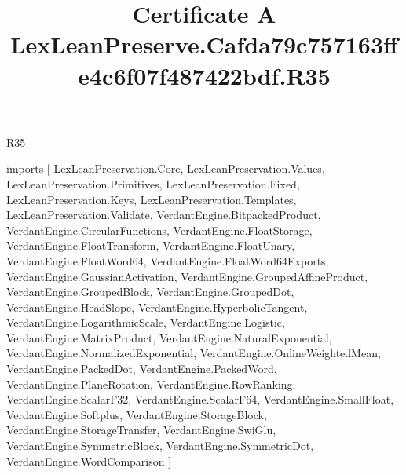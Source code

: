 \begin{lexlean}{R35}
\title{Certificate A LexLeanPreserve.Cafda79c757163ffe4c6f07f487422bdf.R35}
\begin{coremodule}
imports [
  LexLeanPreservation.Core,
  LexLeanPreservation.Values,
  LexLeanPreservation.Primitives,
  LexLeanPreservation.Fixed,
  LexLeanPreservation.Keys,
  LexLeanPreservation.Templates,
  LexLeanPreservation.Validate,
  VerdantEngine.BitpackedProduct,
  VerdantEngine.CircularFunctions,
  VerdantEngine.FloatStorage,
  VerdantEngine.FloatTransform,
  VerdantEngine.FloatUnary,
  VerdantEngine.FloatWord64,
  VerdantEngine.FloatWord64Exports,
  VerdantEngine.GaussianActivation,
  VerdantEngine.GroupedAffineProduct,
  VerdantEngine.GroupedBlock,
  VerdantEngine.GroupedDot,
  VerdantEngine.HeadSlope,
  VerdantEngine.HyperbolicTangent,
  VerdantEngine.LogarithmicScale,
  VerdantEngine.Logistic,
  VerdantEngine.MatrixProduct,
  VerdantEngine.NaturalExponential,
  VerdantEngine.NormalizedExponential,
  VerdantEngine.OnlineWeightedMean,
  VerdantEngine.PackedDot,
  VerdantEngine.PackedWord,
  VerdantEngine.PlaneRotation,
  VerdantEngine.RowRanking,
  VerdantEngine.ScalarF32,
  VerdantEngine.ScalarF64,
  VerdantEngine.SmallFloat,
  VerdantEngine.Softplus,
  VerdantEngine.StorageBlock,
  VerdantEngine.StorageTransfer,
  VerdantEngine.SwiGlu,
  VerdantEngine.SymmetricBlock,
  VerdantEngine.SymmetricDot,
  VerdantEngine.WordComparison
]


\end{coremodule}
\end{lexlean}
